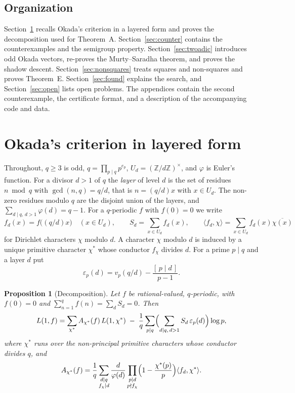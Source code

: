 \documentclass[11pt]{amsart}
\newtheorem{proposition}[theorem]{Proposition}
\theoremstyle{definition}
\theoremstyle{remark}
\providecommand{\Z}{\mathbb Z}
\newcommand{\ip}[2]{\langle #1,#2\rangle}
\numberwithin{equation}{section}
\begin{document}
\subsection{Organization}
Section~\ref{sec:okada} recalls Okada's criterion in a layered form and proves the decomposition used for Theorem~A.
Section~\ref{sec:counter} contains the counterexamples and the semigroup property.
Section~\ref{sec:twoadic} introduces odd Okada vectors, re-proves the Murty--Saradha theorem, and proves the shadow descent.
Section~\ref{sec:nonsquares} treats squares and non-squares and proves Theorem~E.
Section~\ref{sec:found} explains the search, and Section~\ref{sec:open} lists open problems.
The appendices contain the second counterexample, the certificate format, and a description of the accompanying code and data.

\section{Okada's criterion in layered form}\label{sec:okada}

Throughout, $q\ge3$ is odd, $q=\prod_{p\mid q}p^{e_p}$, $U_d=(\Z/d\Z)^\times$, and $\varphi$ is Euler's function.
For a divisor $d>1$ of $q$ the \emph{layer} of level $d$ is the set of residues $n\bmod q$ with $\gcd(n,q)=q/d$, that is $n=(q/d)x$ with $x\in U_d$.
The non-zero residues modulo $q$ are the disjoint union of the layers, and $\sum_{d\mid q,\,d>1}\varphi(d)=q-1$.
For a $q$-periodic $f$ with $f(0)=0$ we write
\[
f_d(x)=f\bigl((q/d)x\bigr)\quad(x\in U_d),\qquad S_d=\sum_{x\in U_d}f_d(x),\qquad \ip{f_d}{\chi}=\sum_{x\in U_d}f_d(x)\overline{\chi(x)}
\]
for Dirichlet characters $\chi$ modulo $d$.
A character $\chi$ modulo $d$ is induced by a unique primitive character $\chi^*$ whose conductor $f_\chi$ divides $d$.
For a prime $p\mid q$ and a layer $d$ put
\begin{equation}\label{eq:eps}
\varepsilon_p(d)=v_p(q/d)-\frac{[\,p\mid d\,]}{p-1}.
\end{equation}

\begin{proposition}[Decomposition]\label{prop:decomp}
Let $f$ be rational-valued, $q$-periodic, with $f(0)=0$ and $\sum_{n=1}^{q}f(n)=\sum_{d}S_d=0$.
Then
\begin{equation}\label{eq:decomp}
L(1,f)=\sum_{\chi^*}A_{\chi^*}(f)\,L(1,\chi^*)\;-\;\frac1q\sum_{p\mid q}\Bigl(\sum_{d\mid q,\,d>1}S_d\,\varepsilon_p(d)\Bigr)\log p,
\end{equation}
where $\chi^*$ runs over the non-principal primitive characters whose conductor divides $q$, and
\begin{equation}\label{eq:A}
A_{\chi^*}(f)=\frac1q\sum_{\substack{d\mid q\\ f_{\chi}\mid d}}\frac{d}{\varphi(d)}\prod_{\substack{p\mid d\\ p\nmid f_\chi}}\Bigl(1-\frac{\chi^*(p)}{p}\Bigr)\ip{f_d}{\chi^*}.
\end{equation}
\end{proposition}
\end{document}
